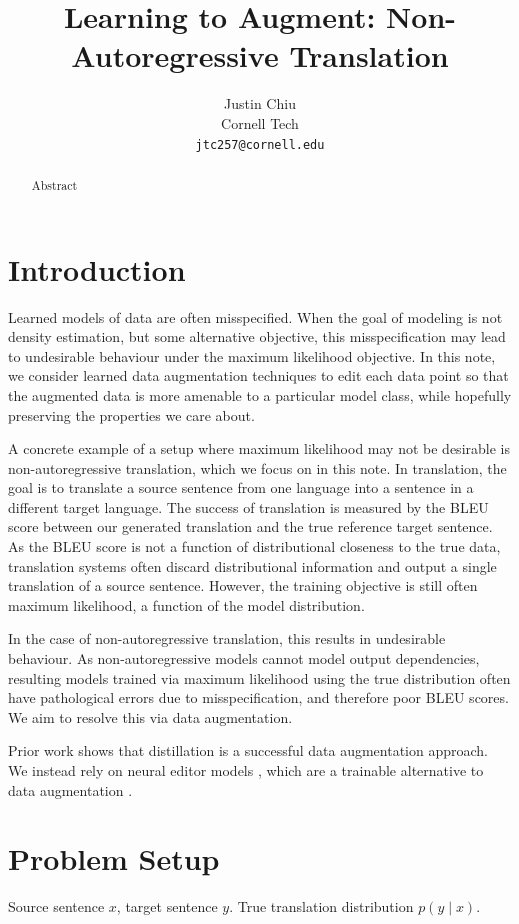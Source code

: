 \documentclass[11pt]{article}
\title{Learning to Augment: Non-Autoregressive Translation}
\author{Justin Chiu \\
  Cornell Tech \\
  \texttt{jtc257@cornell.edu}}
\begin{document}
\maketitle
\begin{abstract}
Abstract
\end{abstract}

\section{Introduction}
Learned models of data are often misspecified.
When the goal of modeling is not density estimation,
but some alternative objective, this misspecification may lead to undesirable
behaviour under the maximum likelihood objective.
In this note, we consider learned data augmentation techniques to edit
each data point so that the augmented data is more amenable to a particular model class,
while hopefully preserving the properties we care about.

A concrete example of a setup where maximum likelihood may not be desirable is
non-autoregressive translation, which we focus on in this note.
In translation, the goal is to translate a source sentence from one language
into a sentence in a different target language.
The success of translation is measured by the BLEU score
between our generated translation and the true reference target sentence.
As the BLEU score is not a function of distributional closeness to the true data,
translation systems often discard distributional information and
output a single translation of a source sentence.
However, the training objective is still often maximum likelihood, a function of
the model distribution.

In the case of non-autoregressive translation, this results in undesirable behaviour.
As non-autoregressive models cannot model output dependencies,
resulting models trained via maximum likelihood using the true distribution
often have pathological errors due to misspecification,
and therefore poor BLEU scores.
We aim to resolve this via data augmentation.

Prior work shows that distillation is a successful data augmentation approach.
We instead rely on neural editor models \citep{edit},
which are a trainable alternative to data augmentation \citep{recombine}.

\section{Problem Setup}
Source sentence $x$, target sentence $y$.
True translation distribution $p(y \mid x)$.
\end{document}
